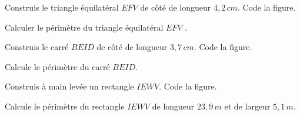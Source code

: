 \begin{pageAD} 


 \begin{minipage}{.48\linewidth}
 
Construis le  triangle équilatéral $EFV$  de côté de longueur  $4,2\,cm$. Code la figure.

\vspace{5cm}
 \end{minipage}
 \hfill
 \begin{minipage}{.38\linewidth}
Calculer le périmètre  du triangle équilatéral $EFV$ . 
 \end{minipage}
 

 \begin{minipage}{.58\linewidth}
Construis le carré $BEID$ de côté de longueur $3,7\,cm$. Code la figure.

\vspace{5cm}
 \end{minipage} \hfill
 \begin{minipage}{.48\linewidth}
Calcule le périmètre du carré $BEID$. 

 \end{minipage}
 
  


\begin{minipage}{.38\linewidth}
 
Construis à main levée un rectangle $IEWV$. Code la figure.

\vspace{5cm}
 \end{minipage} \hfill
 \begin{minipage}{.58\linewidth}
Calcule le périmètre du rectangle $IEWV$ de longueur $23,9\,m$ et de largeur $5,1\,m$. 

\end{minipage}

 

 
\end{pageAD} 
